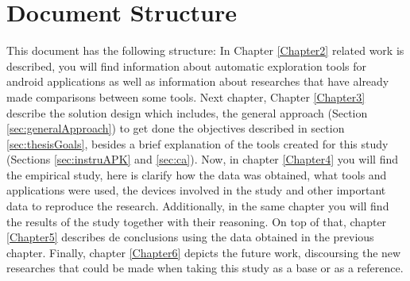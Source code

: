 	
\section{Document Structure}

This document has the following structure: In Chapter \ref{Chapter2} related work is described, you will find information about automatic exploration tools for android applications as well as information about researches that have already made comparisons between some tools. Next chapter, Chapter \ref{Chapter3} describe the solution design which includes, the general approach (Section \ref{sec:generalApproach}) to get done the objectives described in section \ref{sec:thesisGoals}, besides a brief explanation of the tools created for this study (Sections \ref{sec:instruAPK} and \ref{sec:ca}). Now, in chapter \ref{Chapter4} you will find the empirical study, here is clarify how the data was obtained, what tools and applications were used, the devices involved in the study and other important data to reproduce the research. Additionally, in the same chapter you will find the results of the study together with their reasoning. On top of that, chapter \ref{Chapter5} describes de conclusions using the data obtained in the previous chapter. Finally, chapter \ref{Chapter6} depicts the future work, discoursing the new researches that could be made when taking this study as a base or as a reference.
